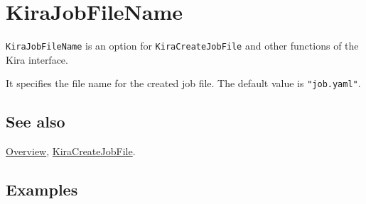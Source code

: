 \documentclass[../FeynHelpersManual.tex]{subfiles}
\begin{document}
\begin{Shaded}
\begin{Highlighting}[]
 
\end{Highlighting}
\end{Shaded}

\hypertarget{kirajobfilename}{
\section{KiraJobFileName}\label{kirajobfilename}}

\texttt{KiraJobFileName} is an option for \texttt{KiraCreateJobFile} and
other functions of the Kira interface.

It specifies the file name for the created job file. The default value
is \texttt{"job.yaml"}.

\subsection{See also}

\hyperlink{toc}{Overview},
\hyperlink{kiracreatejobfile}{KiraCreateJobFile}.

\subsection{Examples}
\end{document}
